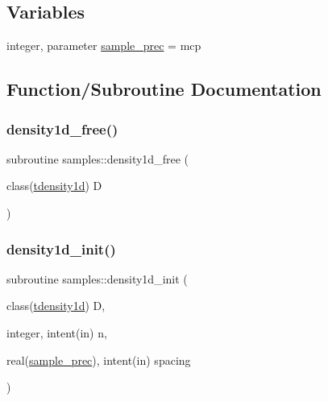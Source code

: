 \subsection*{Variables}
\begin{DoxyCompactItemize}
\item 
integer, parameter \mbox{\hyperlink{namespacesamples_ab1a059d29fb6ed2517c01f6aef7713d3}{sample\+\_\+prec}} = mcp
\end{DoxyCompactItemize}


\subsection{Function/\+Subroutine Documentation}
\mbox{\label{namespacesamples_a106842e32d665154377f9c3bc1682b59}} 
\subsubsection{\texorpdfstring{density1d\+\_\+free()}{density1d\_free()}}
{\footnotesize\ttfamily subroutine samples\+::density1d\+\_\+free (\begin{DoxyParamCaption}\item[{class(\mbox{\hyperlink{structsamples_1_1tdensity1d}{tdensity1d}})}]{D }\end{DoxyParamCaption})}

\mbox{\label{namespacesamples_a81e4c9e95f7f4a62799689997c7be5e7}} 
\subsubsection{\texorpdfstring{density1d\+\_\+init()}{density1d\_init()}}
{\footnotesize\ttfamily subroutine samples\+::density1d\+\_\+init (\begin{DoxyParamCaption}\item[{class(\mbox{\hyperlink{structsamples_1_1tdensity1d}{tdensity1d}})}]{D,  }\item[{integer, intent(in)}]{n,  }\item[{real(\mbox{\hyperlink{namespacesamples_ab1a059d29fb6ed2517c01f6aef7713d3}{sample\+\_\+prec}}), intent(in)}]{spacing }\end{DoxyParamCaption})}


